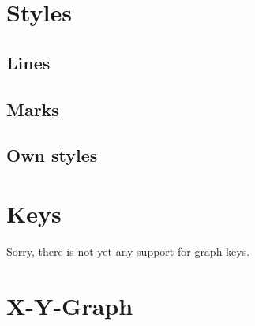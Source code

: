 \section{Styles}

\subsection{Lines}

\subsection{Marks}

\subsection{Own styles}

\section{Keys}
Sorry, there is not yet any support for graph keys.

\section{X-Y-Graph}

